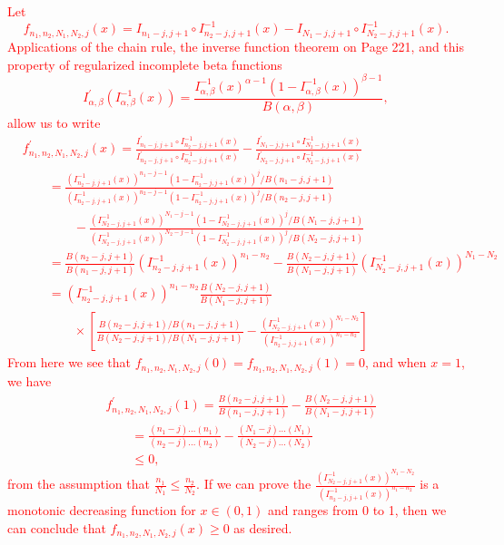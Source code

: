 \documentclass[12pt]{article}
\begin{document}
\textcolor{red}{Let
$$
  f_{n_1,n_2,N_1,N_2,j}(x) = I_{n_1-j,j+1} \circ I_{n_2-j,j+1}^{-1}(x) - I_{N_1-j,j+1} \circ I_{N_2-j,j+1}^{-1}(x).
$$
Applications of the chain rule, the inverse function theorem \citep{rudin1964principles} on Page 221, and this property of regularized incomplete beta functions
$$
  I^\prime_{\alpha,\beta}(I^{-1}_{\alpha,\beta}(x)) = \frac{I^{-1}_{\alpha,\beta}(x)^{\alpha-1}(1 - I^{-1}_{\alpha,\beta}(x))^{\beta-1}}{B(\alpha,\beta)}, 
$$
allow us to write 
\begin{align*}
	&f^\prime_{n_1,n_2,N_1,N_2,j}(x) = \frac{ I^\prime_{n_1-j,j+1} \circ I_{n_2-j,j+1}^{-1}(x)}{ I^\prime_{n_2-j,j+1} \circ I_{n_2-j,j+1}^{-1}(x)} - \frac{ I^\prime_{N_1-j,j+1} \circ I_{N_2-j,j+1}^{-1}(x)}{ I^\prime_{N_2-j,j+1} \circ I_{N_2-j,j+1}^{-1}(x)} \\
	&\qquad= \frac{\left(I_{n_2-j, j+1}^{-1}(x)\right)^{n_1-j-1}\left(1 - I_{n_2-j, j+1}^{-1}(x)\right)^{j}/B(n_1-j,j+1)}{\left(I_{n_2-j, j+1}^{-1}(x)\right)^{n_2-j-1}\left(1 - I_{n_2-j, j+1}^{-1}(x)\right)^{j}/B(n_2-j,j+1)} \\
	&\qquad\qquad - \frac{\left(I_{N_2-j, j+1}^{-1}(x)\right)^{N_1-j-1}\left(1 - I_{N_2-j, j+1}^{-1}(x)\right)^{j}/B(N_1-j,j+1)}{\left(I_{N_2-j, j+1}^{-1}(x)\right)^{N_2-j-1}\left(1 - I_{N_2-j, j+1}^{-1}(x)\right)^{j}/B(N_2-j,j+1)}\\
	&\qquad= \frac{B(n_2-j,j+1)}{B(n_1-j,j+1)}\left(I_{n_2-j, j+1}^{-1}(x)\right)^{n_1 - n_2} - \frac{B(N_2 -j, j+1)}{B(N_1-j,j+1)}\left(I_{N_2-j, j+1}^{-1}(x)\right)^{N_1 - N_2} \\
	&\qquad= \left(I_{n_2-j,j+1}^{-1}(x)\right)^{n_1-n_2}\frac{B(N_2-j,j+1)}{B(N_1-j,j+1)} \\ 
	&\qquad\qquad \times\left[ \frac{B(n_2 -j, j+1)/B(n_1-j,j+1)}{B(N_2-j,j+1)/B(N_1-j,j+1)} - \frac{\left(I_{N_2-j, j+1}^{-1}(x)\right)^{N_1 - N_2}}{\left(I_{n_2-j, j+1}^{-1}(x)\right)^{n_1 - n_2}}\right]
\end{align*}
From here we see that $f_{n_1,n_2,N_1,N_2,j}(0) = f_{n_1,n_2,N_1,N_2,j}(1) = 0$, and when $x = 1$, we have 
\begin{align*}
	&f^\prime_{n_1,n_2,N_1,N_2,j}(1) = \frac{B(n_2-j,j+1)}{B(n_1-j,j+1)} - \frac{B(N_2 -j, j+1)}{B(N_1-j,j+1)}\\
	&\qquad= \frac{(n_1 - j)\dots(n_1)}{(n_2 - j)\dots(n_2)} - \frac{(N_1 - j)\dots(N_1)}{(N_2 - j)\dots(N_2)} \\
	&\qquad\leq 0,
\end{align*}
from the assumption that $\frac{n_1}{N_1} \leq \frac{n_2}{N_2}$. If we can prove the $\frac{\left(I_{N_2-j, j+1}^{-1}(x)\right)^{N_1 - N_2}}{\left(I_{n_2-j, j+1}^{-1}(x)\right)^{n_1 - n_2}}$ is a monotonic decreasing function for $x \in (0,1)$ and ranges from 0 to 1, then we can conclude that $f_{n_1,n_2,N_1,N_2,j}(x) \geq 0$ as desired.}





\end{document}
